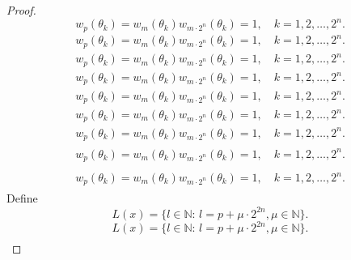 \documentclass{amsart}
\numberwithin{equation}{section}
\begin{document}
\begin{proof}
{\begin{equation}\label{a13}
w_p(\theta_k)=w_m(\theta_k)w_{m\cdot 2^n}(\theta_k)=1,\quad k=1,2,\ldots, 2^n.
\end{equation}\fi   
{}\begin{align*}\label{a13}
w_p(\theta_k)=w_m(\theta_k)w_{m\cdot 2^n}(\theta_k)=1,\quad k=1,2,\ldots, 2^n.
\end{align*}\fi   
{}\begin{align}\label{a13}
w_p(\theta_k)=w_m(\theta_k)w_{m\cdot 2^n}(\theta_k)=1,\quad k=1,2,\ldots, 2^n.
\end{align}\fi    
{}\begin{gather*}\label{a13}
w_p(\theta_k)=w_m(\theta_k)w_{m\cdot 2^n}(\theta_k)=1,\quad k=1,2,\ldots, 2^n.
\end{gather*}\fi  
{}\begin{gather}\label{a13}
w_p(\theta_k)=w_m(\theta_k)w_{m\cdot 2^n}(\theta_k)=1,\quad k=1,2,\ldots, 2^n.
\end{gather}\fi   
{}\begin{multline*}\label{a13}
w_p(\theta_k)=w_m(\theta_k)w_{m\cdot 2^n}(\theta_k)=1,\quad k=1,2,\ldots, 2^n.
\end{multline*}\fi  
{}\begin{multline}\label{a13}
w_p(\theta_k)=w_m(\theta_k)w_{m\cdot 2^n}(\theta_k)=1,\quad k=1,2,\ldots, 2^n.
\end{multline}\fi  
{}\begin{multline*}\begin{split}\label{a13}
w_p(\theta_k)=w_m(\theta_k)w_{m\cdot 2^n}(\theta_k)=1,\quad k=1,2,\ldots, 2^n.
\end{split}\end{multline*}\fi
{}\begin{multline}\begin{split}\label{a13}
w_p(\theta_k)=w_m(\theta_k)w_{m\cdot 2^n}(\theta_k)=1,\quad k=1,2,\ldots, 2^n.
\end{split}\end{multline}\fi
}
Define
{
\begin{equation*} \label{a6}
L(x)=\{l\in{\ensuremath{\mathbb N}}:\, l=p+\mu\cdot2^{2n}, \mu \in {\ensuremath{\mathbb N}}\}.
 \end{equation*}\fi  
{}\begin{equation}\label{a6}
L(x)=\{l\in{\ensuremath{\mathbb N}}:\, l=p+\mu\cdot2^{2n}, \mu \in {\ensuremath{\mathbb N}}\}.
\end{equation}\fi   
{}\begin{align*}\label{a6}

\end{align*}}
\end{proof}
\end{document}

